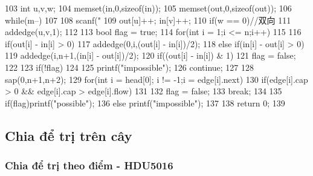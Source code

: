 \documentclass[11pt]{article}
\begin{document}
\begin{Code}
{{103             int u,v,w;
104             memset(in,0,sizeof(in));
105             memset(out,0,sizeof(out));
106             while(m--)
107             {
108                 scanf("%
109                 out[u]++; in[v]++;
110                 if(w == 0)//双向
111                     addedge(u,v,1);
112             }
113             bool flag = true;
114             for(int i = 1;i <= n;i++)
115             {
116                 if(out[i] - in[i] > 0)
117                     addedge(0,i,(out[i] - in[i])/2);
118                 else if(in[i] - out[i] > 0)
119                     addedge(i,n+1,(in[i] - out[i])/2);
120                 if((out[i] - in[i]) & 1)
121                     flag = false;
122             }
123             if(!flag)
124             {
125                 printf("impossible\n");
126                 continue;
127             }
128             sap(0,n+1,n+2);
129             for(int i = head[0]; i != -1;i = edge[i].next)
130                 if(edge[i].cap > 0 && edge[i].cap > edge[i].flow)
131                 {
132                     flag = false;
133                     break;
134                 }
135             if(flag)printf("possible\n");
136             else printf("impossible\n");
137      }
138      return 0;
139 }
\end{Code}

\subsection{Chia để trị trên cây}

\subsubsection{Chia để trị theo điểm - HDU5016}
\end{document}
